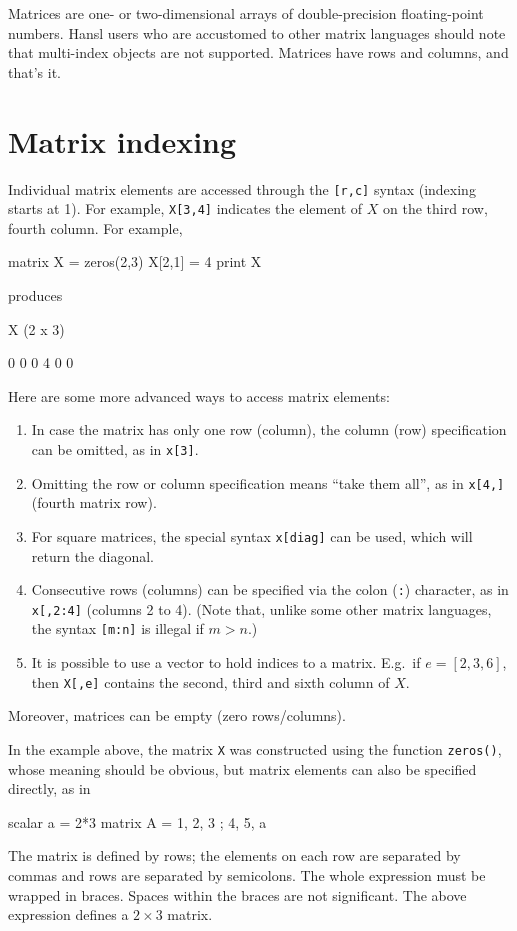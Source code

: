 Matrices are one- or two-dimensional arrays of double-precision
floating-point numbers. Hansl users who are accustomed to other matrix
languages should note that multi-index objects are not
supported. Matrices have rows and columns, and that's it.

\section{Matrix indexing}
\label{sec:mat-index}

Individual matrix elements are accessed through the \verb|[r,c]|
syntax (indexing starts at 1). For example, \texttt{X[3,4]} indicates
the element of $X$ on the third row, fourth column. For example,
\begin{code}
  matrix X = zeros(2,3)
  X[2,1] = 4
  print X
\end{code}
produces
\begin{code}
X (2 x 3)

  0   0   0 
  4   0   0 
\end{code}

Here are some more advanced ways to access matrix elements:
\begin{enumerate}
\item In case the matrix has only one row (column), the column (row)
  specification can be omitted, as in \texttt{x[3]}.
\item Omitting the row or column specification means ``take them
  all'', as in \texttt{x[4,]} (fourth matrix row).
\item For square matrices, the special syntax \texttt{x[diag]} can be
  used, which will return the diagonal.
\item Consecutive rows (columns) can be specified via the colon
  (\texttt{:}) character, as in \texttt{x[,2:4]} (columns 2 to 4).
  (Note that, unlike some other matrix languages, the syntax
  \texttt{[m:n]} is illegal if $m>n$.)
\item It is possible to use a vector to hold indices to a matrix. E.g.\
  if $e = [2,3,6]$, then \texttt{X[,e]} contains the second, third and
  sixth column of $X$.
\end{enumerate}
Moreover, matrices can be empty (zero rows/columns). 

In the example above, the matrix \texttt{X} was constructed using
the function \texttt{zeros()}, whose meaning should be obvious, but
matrix elements can also be specified directly, as in
\begin{code}
scalar a = 2*3
matrix A = { 1, 2, 3 ; 4, 5, a }
\end{code}
The matrix is defined by rows; the elements on each row are separated
by commas and rows are separated by semicolons.  The whole expression
must be wrapped in braces.  Spaces within the braces are not
significant. The above expression defines a $2\times3$ matrix.

